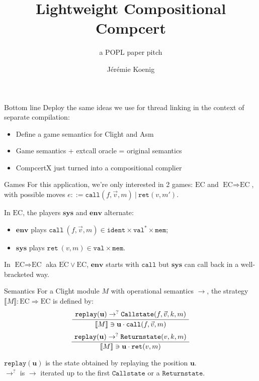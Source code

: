 \documentclass{beamer}
\title{Lightweight Compositional Compcert}
\subtitle{a POPL paper pitch}
\author{J\'er\'emie Koenig}
\newcommand{\EC}{\text{EC}}
\newcommand{\nEC}{\overline{\EC}}
\newcommand{\ECEC}{\EC \Rightarrow \EC}
\newcommand{\kw}[1]{\texttt{#1}}
\newcommand{\word}[1]{\mathbf{#1}}
\newcommand{\sys}{\textbf{sys}}
\newcommand{\env}{\textbf{env}}
\newcommand{\ident}{\kw{ident}}
\newcommand{\val}{\kw{val}}
\newcommand{\mem}{\kw{mem}}
\begin{document}
\begin{frame}
\titlepage
\end{frame}

\begin{frame}{Bottom line} %
Deploy the same ideas we use for thread linking
in the context of separate compilation:
\begin{itemize}
\item Define a game semantics for Clight and Asm
\item Game semantics + extcall oracle = original semantics
\item CompcertX just turned into a compositional complier
\end{itemize}
\end{frame}

\begin{frame}{Games} %
For this application,
we're only interested in 2 games: $\EC$ and $\ECEC$,
with possible moves
$e ::= \kw{call}(f, \vec{v}, m) \ \vert\ \kw{ret}(v, m')$.

In $\EC$, the players $\sys$ and $\env$ alternate:
\begin{itemize}
\item $\env$ plays $\kw{call}\ (f, \vec{v}, m) \in \ident \times \val^* \times \mem$;
\item $\sys$ plays $\kw{ret}\ (v, m) \in \val \times \mem$.
\end{itemize}

In $\ECEC$ aka $\nEC \vee \EC$, $\env$ starts with $\kw{call}$ but
$\sys$ can call back in a well-bracketed way.
\end{frame}

\begin{frame}{Semantics} %
For a Clight module $M$ with operational semantics $\rightarrow$,
the strategy $\llbracket M \rrbracket : \ECEC$ is defined by:
\[
	\AxiomC{$\kw{replay}(\word{u})
		\rightarrow^?
		\kw{Callstate}(f, \vec{v}, k, m)$}
	\UnaryInfC{$\llbracket M \rrbracket \ni
		\word{u} \cdot \kw{call}(f, \vec{v}, m)$}
	\DisplayProof
\]
\[
	\AxiomC{$\kw{replay}(\word{u})
		\rightarrow^?
		\kw{Returnstate}(v, k, m)$}
	\UnaryInfC{$\llbracket M \rrbracket \ni
		\word{u} \cdot \kw{ret}(v, m)$}
	\DisplayProof
\]

$\kw{replay}(\word{u})$ is the state obtained
by replaying the position $\word{u}$. \\
$\rightarrow^{?}$ is $\rightarrow$ iterated
up to the first $\kw{Callstate}$ or a $\kw{Returnstate}$.
\end{frame}
\end{document}
